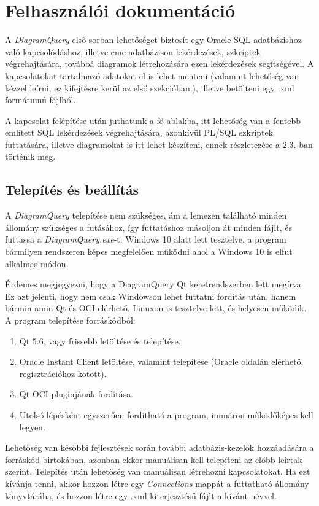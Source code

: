 \chapter{Felhasználói dokumentáció}
A \textit{DiagramQuery} első sorban lehetőséget biztosít egy Oracle SQL adatbázishoz való kapcsolódáshoz, illetve
eme adatbázison lekérdezések, szkriptek végrehajtására, továbbá diagramok létrehozására ezen lekérdezések
segítségével.
A kapcsolatokat tartalmazó adatokat el is lehet menteni (valamint lehetőség van kézzel leírni,
ez kifejtésre kerül az első szekcióban.), illetve betölteni egy .xml formátumú fájlból.

A kapcsolat felépítése után juthatunk a fő ablakba, itt lehetőség van a fentebb említett SQL lekérdezések végrehajtására, 
azonkívül PL/SQL szkriptek futtatására,
illetve diagramokat is itt lehet készíteni, ennek részletezése a 2.3.-ban történik meg.

\section{Telepítés és beállítás}
A \textit{DiagramQuery} telepítése nem szükséges, ám a lemezen található minden állomány szükséges a futásához,
így futtatáshoz másoljon át minden fájlt, és futtassa a \textit{DiagramQuery.exe}-t.
Windows 10 alatt lett tesztelve, a program bármilyen rendszeren képes megfelelően működni ahol a
Windows 10 is elfut alkalmas módon.

Érdemes megjegyezni, hogy a DiagramQuery Qt keretrendszerben lett megírva. Ez azt jelenti, hogy nem csak Windowson lehet
futtatni fordítás után, hanem bármin amin Qt és OCI elérhető. Linuxon is tesztelve lett, és helyesen működik. A program telepítése
forráskódból:
\begin{enumerate}
  \item Qt 5.6, vagy frissebb letöltése és telepítése.
  \item Oracle Instant Client letöltése, valamint telepítése (Oracle oldalán elérhető, regisztrációhoz kötött).
  \item Qt OCI pluginjának fordítása.
  \item Utolsó lépésként egyszerűen fordítható a program, immáron működőképes kell legyen.
\end{enumerate}

Lehetőség van későbbi fejlesztések során további adatbázis-kezelők hozzáadására a forráskód birtokában, azonban ekkor
manuálisan kell telepíteni az előbb leírtak szerint.
Telepítés után lehetőség van manuálisan létrehozni kapcsolatokat. Ha ezt kívánja tenni, akkor hozzon létre egy
\textit{Connections} mappát a futtatható állomány könyvtárába, és hozzon létre egy .xml kiterjesztésű fájlt a kívánt névvel.

